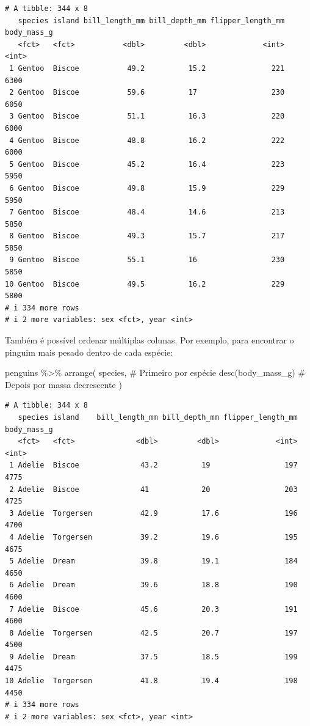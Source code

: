 \documentclass[
  12pt,
  letterpaper,
  DIV=11,
  numbers=noendperiod]{scrreprt}
\newenvironment{Shaded}{\begin{snugshade}}{\end{snugshade}}
\newcommand{\CommentTok}[1]{\textcolor[rgb]{0.37,0.37,0.37}{#1}}
\newcommand{\FunctionTok}[1]{\textcolor[rgb]{0.28,0.35,0.67}{#1}}
\newcommand{\NormalTok}[1]{\textcolor[rgb]{0.00,0.23,0.31}{#1}}
\newcommand{\SpecialCharTok}[1]{\textcolor[rgb]{0.37,0.37,0.37}{#1}}
\theoremstyle{definition}
\theoremstyle{exemplo}
\begin{document}
\begin{verbatim}
# A tibble: 344 x 8
   species island bill_length_mm bill_depth_mm flipper_length_mm body_mass_g
   <fct>   <fct>           <dbl>         <dbl>             <int>       <int>
 1 Gentoo  Biscoe           49.2          15.2               221        6300
 2 Gentoo  Biscoe           59.6          17                 230        6050
 3 Gentoo  Biscoe           51.1          16.3               220        6000
 4 Gentoo  Biscoe           48.8          16.2               222        6000
 5 Gentoo  Biscoe           45.2          16.4               223        5950
 6 Gentoo  Biscoe           49.8          15.9               229        5950
 7 Gentoo  Biscoe           48.4          14.6               213        5850
 8 Gentoo  Biscoe           49.3          15.7               217        5850
 9 Gentoo  Biscoe           55.1          16                 230        5850
10 Gentoo  Biscoe           49.5          16.2               229        5800
# i 334 more rows
# i 2 more variables: sex <fct>, year <int>
\end{verbatim}

\noindent Também é possível ordenar múltiplas colunas. Por exemplo, para
encontrar o pinguim mais pesado dentro de cada espécie:

\begin{Shaded}
\begin{Highlighting}[]
\NormalTok{penguins }\SpecialCharTok{\%\textgreater{}\%} 
  \FunctionTok{arrange}\NormalTok{(}
\NormalTok{    species, }\CommentTok{\# Primeiro por espécie}
    \FunctionTok{desc}\NormalTok{(body\_mass\_g) }\CommentTok{\# Depois por massa decrescente}
\NormalTok{  )}
\end{Highlighting}
\end{Shaded}

\begin{verbatim}
# A tibble: 344 x 8
   species island    bill_length_mm bill_depth_mm flipper_length_mm body_mass_g
   <fct>   <fct>              <dbl>         <dbl>             <int>       <int>
 1 Adelie  Biscoe              43.2          19                 197        4775
 2 Adelie  Biscoe              41            20                 203        4725
 3 Adelie  Torgersen           42.9          17.6               196        4700
 4 Adelie  Torgersen           39.2          19.6               195        4675
 5 Adelie  Dream               39.8          19.1               184        4650
 6 Adelie  Dream               39.6          18.8               190        4600
 7 Adelie  Biscoe              45.6          20.3               191        4600
 8 Adelie  Torgersen           42.5          20.7               197        4500
 9 Adelie  Dream               37.5          18.5               199        4475
10 Adelie  Torgersen           41.8          19.4               198        4450
# i 334 more rows
# i 2 more variables: sex <fct>, year <int>
\end{verbatim}
\end{document}
